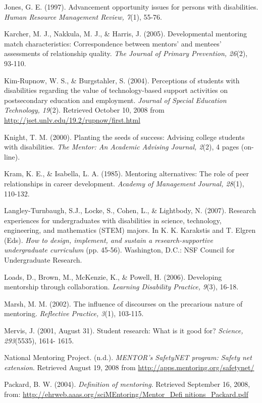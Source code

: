 \documentclass[11.5pt]{sig-alternate} %
\begin{document}
Jones, G. E. (1997). Advancement opportunity issues for persons with disabilities. \textit{Human Resource Management Review, 7}(1), 55-76.

Karcher, M. J., Nakkula, M. J., \& Harris, J. (2005). Developmental mentoring match characteristics: Correspondence between mentors' and mentees' assessments of relationship quality. \textit{The Journal of Primary Prevention, 26}(2), 93-110.

Kim-Rupnow, W. S., \& Burgstahler, S. (2004). Perceptions of students with disabilities regarding the value of technology-based support activities on postsecondary education and employment. \textit{Journal of Special Education Technology, 19}(2). Retrieved October 10, 2008 from \url{http://jset.unlv.edu/19.2/rupnow/first.html}

Knight, T. M. (2000). Planting the seeds of success: Advising college students with disabilities. \textit{The Mentor: An Academic Advising Journal, 2}(2), 4 pages (on-line).

Kram, K. E., \& Isabella, L. A. (1985). Mentoring alternatives: The role of peer relationships in career development.\textit{ Academy of Management Journal, 28}(1), 110-132.

Langley-Turnbaugh, S.J., Locke, S., Cohen, L., \& Lightbody, N. (2007). Research experiences for undergraduates with disabilities in science, technology, engineering, and mathematics (STEM) majors. In K. K. Karakstis and T. Elgren (Eds). \textit{How to design, implement, and sustain a research-supportive undergraduate curriculum} (pp. 45-56). Washington, D.C.: NSF Council for Undergraduate Research.

Loads, D., Brown, M., McKenzie, K., \& Powell, H. (2006). Developing mentorship through collaboration. \textit{Learning Disability Practice, 9}(3), 16-18.

Marsh, M. M. (2002). The influence of discourses on the precarious nature of mentoring. \textit{Reflective Practice, 3}(1), 103-115.

Mervis, J. (2001, August 31). Student research: What is it good for?\textit{ Science, 293}(5535), 1614- 1615.

National Mentoring Project. (n.d.).\textit{ MENTOR’s SafetyNET program: Safety net extension}. Retrieved August 19, 2008 from \url{http://apps.mentoring.org/safetynet/}

Packard, B. W. (2004).\textit{ Definition of mentoring}. Retrieved September 16, 2008, from: \url{http://ehrweb.aaas.org/sciMEntoring/Mentor_Defi nitions_Packard.pdf}
\end{document}
